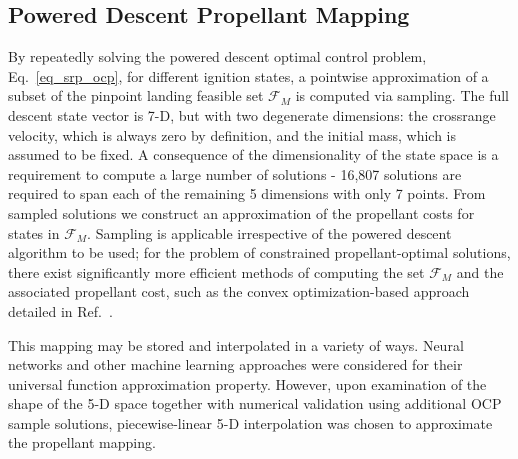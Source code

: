 \documentclass[letterpaper, paper,11pt]{AAS}
\begin{document}
\subsection{Powered Descent Propellant Mapping}
By repeatedly solving the powered descent optimal control problem, Eq.~\ref{eq_srp_ocp}, for different ignition states, a pointwise approximation of a subset of the pinpoint landing feasible set $\mathcal{F}_M$ is computed via sampling. The full descent state vector is 7-D, but with two degenerate dimensions: the crossrange velocity, which is always zero by definition, and the initial mass, which is assumed to be fixed. A consequence of the dimensionality of the state space is a requirement to compute a large number of solutions -  16,807 solutions are required to span each of the remaining 5 dimensions with only 7 points. From sampled solutions we construct an approximation of the propellant costs for states in $\mathcal{F}_M$. Sampling is applicable irrespective of the powered descent algorithm to be used; for the problem of constrained propellant-optimal solutions, there exist significantly more efficient methods of computing the set $\mathcal{F}_M$ and the associated propellant cost, such as the convex optimization-based approach detailed in Ref.~\cite{SRP_ControllableSets}.

This mapping may be stored and interpolated in a variety of ways. Neural networks and other machine learning approaches were considered for their universal function approximation property. However, upon examination of the shape of the 5-D space together with numerical validation using additional OCP sample solutions, piecewise-linear 5-D interpolation was chosen to approximate the propellant mapping.
\end{document}
